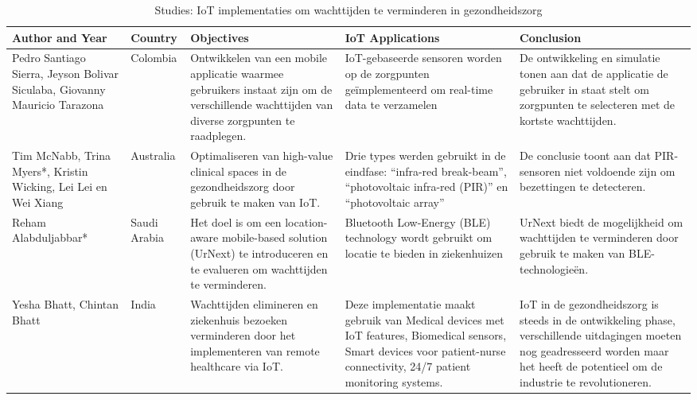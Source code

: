 \begin{table}[h]
    \centering
    \tiny
    \caption{Studies: IoT implementaties om wachttijden te verminderen in gezondheidszorg \autocite{Sierra2017, McNabb2018, Alabduljabbar2022, Bhatt2017, Fischer2020, Chandy2019}}
    \begin{tabularx}{\textwidth}{|p{1.7cm}|p{0.9cm}|p{3.5cm}|p{3.5cm}|X|}
        \hline
        \textbf{Author and Year} & \textbf{Country} & \textbf{Objectives} & \textbf{IoT Applications} & \textbf{Conclusion} \\
        \hline
        Pedro Santiago Sierra, Jeyson Bolivar Siculaba, Giovanny Mauricio Tarazona   
        & Colombia 
        & Ontwikkelen van een mobile applicatie waarmee gebruikers instaat zijn om de verschillende wachttijden van diverse zorgpunten te raadplegen. 
        & IoT-gebaseerde sensoren worden op de zorgpunten geïmplementeerd om real-time data te verzamelen 
        & De ontwikkeling en simulatie tonen aan dat de applicatie de gebruiker in staat stelt om zorgpunten te selecteren met de kortste wachttijden. \\
        \hline
        Tim McNabb, Trina Myers*, Kristin Wicking, Lei Lei en Wei Xiang 
        & Australia 
        & Optimaliseren van high-value clinical spaces in de gezondheidszorg door gebruik te maken van IoT. 
        & Drie types werden gebruikt in de eindfase: “infra-red break-beam”, “photovoltaic infra-red (PIR)” en  “photovoltaic array” 
        & De conclusie toont aan dat PIR-sensoren niet voldoende zijn om bezettingen te detecteren.  \\
        \hline
        Reham Alabduljabbar* 
        & Saudi Arabia 
        & Het doel is om een location-aware mobile-based solution (UrNext) te introduceren en te evalueren om wachttijden te verminderen. 
        & Bluetooth Low-Energy (BLE) technology wordt gebruikt om locatie te bieden in ziekenhuizen 
        & UrNext biedt de mogelijkheid om wachttijden te verminderen door gebruik te maken van BLE-technologieën. \\
        \hline
        Yesha Bhatt, Chintan Bhatt 
        & India 
        & Wachttijden elimineren en ziekenhuis bezoeken verminderen door het implementeren van remote healthcare via IoT.
        & Deze implementatie maakt gebruik van Medical devices met IoT features, Biomedical sensors, Smart devices voor patient-nurse connectivity, 24/7 patient monitoring systems.
        & IoT in de gezondheidszorg is steeds in de ontwikkeling phase, verschillende uitdagingen moeten nog geadresseerd worden maar het heeft de potentieel om de industrie te revolutioneren.   \\

\end{tabularx}
\end{table}
